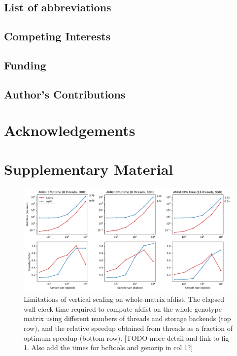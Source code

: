 \documentclass[a4paper,num-refs]{oup-contemporary}
\begin{document}
\subsection{List of abbreviations}

\subsection{Competing Interests}

\subsection{Funding}

\subsection{Author's Contributions}

\section{Acknowledgements}





\clearpage
\renewcommand\thefigure{S\arabic{figure}}
\setcounter{figure}{0}
\renewcommand\thetable{S\arabic{table}}
\setcounter{table}{0}

\section*{Supplementary Material}

\begin{figure}[ht]
	\begin{center}
		\includegraphics[width=\textwidth]{figures/whole-matrix-compute-supplemental}
	\end{center}
	\caption{\label{fig-whole-matrix-compute-supplemental}
    Limitations of vertical scaling on whole-matrix afdist. The elapsed
wall-clock time required to compute afdist on the whole genotype matrix using
different numbers of threads and storage backends (top row), and the relative
speedup obtained from threads as a fraction of optimum speedup (bottom row).
[TODO more detail and link to fig 1. Also add the times for bcftools and
genozip in col 1?]
}
\end{figure}
\end{document}
